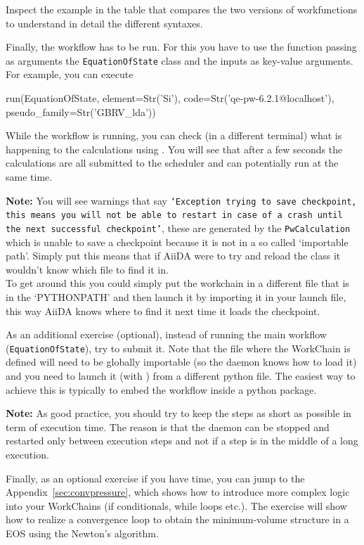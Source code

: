 Inspect the example in the table that compares the two versions of workfunctions to understand in detail the different syntaxes.

Finally, the workflow has to be run. For this you have to use the function  passing as arguments the \texttt{EquationOfState} class and the inputs as key-value arguments. For example, you can execute

\begin{pythoncommand}
 run(EquationOfState, element=Str('Si'), code=Str('qe-pw-6.2.1@localhost'),
     pseudo_family=Str('GBRV_lda'))
\end{pythoncommand}

While the workflow is running, you can check (in a different terminal) what is happening
to the calculations using . You will see that after a few seconds the calculations are all submitted to the scheduler and can potentially run at the same time.

\begin{tcolorbox}
\textbf{Note:}
You will see warnings that say \texttt{`Exception trying to save checkpoint, this means you will not be able to restart in case of a crash until the next successful checkpoint'}, these are generated by the \texttt{PwCalculation} which is unable to save a checkpoint because it is not in a so called `importable path'.  Simply put this means that if AiiDA were to try and reload the class it wouldn't know which file to find it in.\\
To get around this you could simply put the workchain in a different file that is in the `PYTHONPATH' and then launch it by importing it in your launch file, this way AiiDA knows where to find it next time it loads the checkpoint.
\end{tcolorbox}

As an additional exercise (optional), instead of running the main workflow (\texttt{EquationOfState}),
try to submit it. Note that the file where the WorkChain is defined will need to be globally importable (so the daemon knows how to load it) and you need to launch it (with ) from a different python file. The easiest way to achieve this is typically to embed the workflow inside a python package.

\begin{tcolorbox}
\textbf{Note:} 
As good practice, you should try to keep the steps as short as possible in term of execution time. The reason is that the daemon can be stopped and restarted only between execution steps and not if a step is in the middle of a long execution.
\end{tcolorbox}

Finally, as an optional exercise if you have time, you can jump to the Appendix~\ref{sec:convpressure}, which shows how to introduce more complex logic into your WorkChains (if conditionals, while loops etc.). The exercise will show how to realize a convergence loop to obtain the minimum-volume structure in a EOS using the Newton's algorithm.
